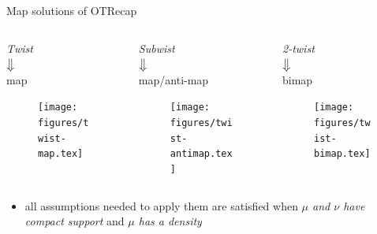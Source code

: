 \documentclass[9pt,xcolor={dvipsnames}]{beamer}
\begin{document}
\begin{frame}[fragile]{Map solutions of OT}{Recap}
    \begin{columns}
        \begin{column}{0.33\textwidth}
            \begin{center}
                \emph{Twist}\\ $\big\Downarrow$\\map
                    \begin{figure}
                        \texttt{[image: figures/twist-map.tex]}
                    \end{figure}
            \end{center}
        \end{column}
        \begin{column}{0.33\textwidth}
            \begin{center}
                \emph{Subwist}\\ $\big\Downarrow$\\map/anti-map
                \begin{figure}
                    \texttt{[image: figures/twist-antimap.tex]}
                \end{figure}
            \end{center}
        \end{column}
        \begin{column}{0.33\textwidth}
            \begin{center}
                \emph{2-twist}\\ $\big\Downarrow$\\bimap
                \begin{figure}
                    \texttt{[image: figures/twist-bimap.tex]}
                \end{figure}
            \end{center}
        \end{column}
    \end{columns}
    \vfill
    \begin{itemize}
        \item all assumptions needed to apply them are satisfied when \emph{$\mu$ and $\nu$ have compact support} and \emph{$\mu$ has a density}
    \end{itemize}
\end{frame}
\end{document}
